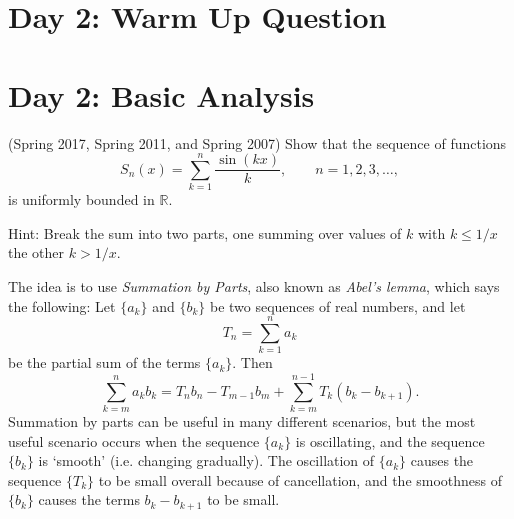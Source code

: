 \documentclass[answers]{exam}
\theoremstyle{problemstyle}
\newcommand{\1}[1]{\textbf{1}_{\left[#1\right]}} %
\def\R{\mathbb{R}} %
\def\blue{\color{Blue}}
\newcommand{\bnote}[1]{{\blue#1}} %
\begin{document}
\begin{questions}
\newpage
\section*{Day 2: Warm Up Question}

\newpage
\section{Day 2: Basic Analysis}

\question (Spring 2017, Spring 2011, and Spring 2007)
Show that the sequence of functions
  \begin{equation*}
    S_n(x)= \sum_{k=1}^{n}\frac{\sin(kx)}{k}, \quad \quad n=1,2,3,\ldots,
  \end{equation*}
  is uniformly bounded in $\R$.

\bnote{Hint: Break the sum into two parts, one summing over values of $k$ with $k \leq 1/x$ the other $k > 1/x$.}
\begin{solution}
The idea is to use \emph{Summation by Parts}, also known as \emph{Abel's lemma}, which says the following: Let $\{ a_k \}$ and $\{ b_k \}$ be two sequences of real numbers, and let
%
\[ T_n = \sum_{k = 1}^n a_k \]
%
be the partial sum of the terms $\{ a_k \}$. Then
%
\[ \sum_{k = m}^n a_k b_k = T_n b_n - T_{m-1} b_m + \sum_{k = m}^{n-1} T_k (b_k - b_{k+1}). \]
%
Summation by parts can be useful in many different scenarios, but the most useful scenario occurs when the sequence $\{ a_k \}$ is oscillating, and the sequence $\{ b_k \}$ is `smooth' (i.e. changing gradually). The oscillation of $\{ a_k \}$ causes the sequence $\{ T_k \}$ to be small overall because of cancellation, and the smoothness of $\{ b_k \}$ causes the terms $b_k - b_{k+1}$ to be small.


\end{solution}
\end{questions}
\end{document}
